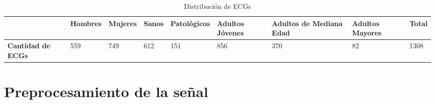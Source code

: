 \documentclass[12pt,letterpaper,oneside,openright]{book}
\begin{document}
\begin{table}[t]
	\begin{center}
		\begin{tabular}{|p{1.85cm}|M{1.7cm}|M{1.55cm}|M{1.15cm}|M{2.2cm}|M{1.5cm}|M{1.5cm}|M{1.5cm}|M{1cm}|}
			\hline
			& \textbf{Hombres} & \textbf{Mujeres} & \textbf{Sanos} & \textbf{Patológicos} & \textbf{Adultos Jóvenes} & \textbf{Adultos de Mediana Edad} & \textbf{Adultos Mayores} & \textbf{Total} \\
			\hline
			\textbf{Cantidad de ECGs} & 559 & 749 & 612 & 151 & 856 & 370 & 82 & 1308 \\
			\hline
		\end{tabular}
		\caption{Distribución de ECGs}
		\label{tab:distriECGs}
	\end{center}
\end{table}


\section{Preprocesamiento de la señal}
	
\end{document}

